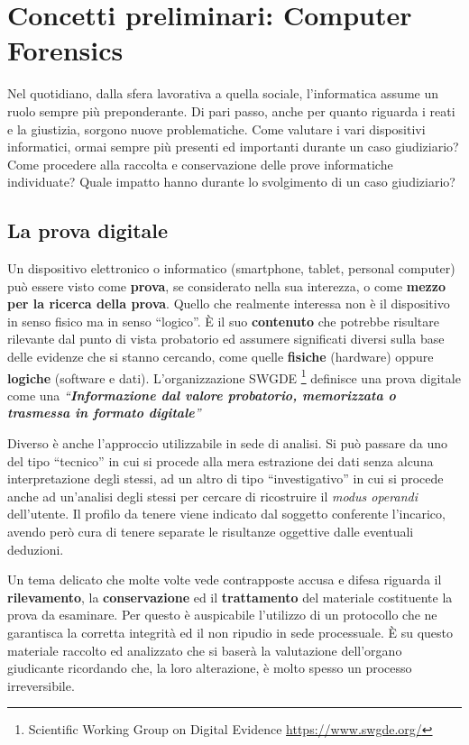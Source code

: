 \chapter{Concetti preliminari: Computer Forensics}


Nel quotidiano, dalla sfera lavorativa a quella sociale, l'informatica assume un ruolo sempre più preponderante. Di pari passo, anche per quanto riguarda i reati e la giustizia, sorgono nuove problematiche. Come valutare i vari dispositivi informatici, ormai sempre più presenti ed importanti durante un caso giudiziario? Come procedere alla raccolta e conservazione delle prove informatiche individuate? Quale impatto hanno durante lo svolgimento di un caso giudiziario? \nocite{Florindi}

\section{La prova digitale}

Un dispositivo elettronico o informatico (smartphone, tablet, personal computer) può essere visto come \textbf{prova}, se considerato nella sua interezza, o come \textbf{mezzo per la ricerca della prova}. Quello che realmente interessa non è il dispositivo in senso fisico ma in senso ``logico''. \`E il suo \textbf{contenuto} che potrebbe risultare rilevante dal punto di vista probatorio ed assumere significati diversi sulla base delle evidenze che si stanno cercando, come quelle \textbf{fisiche} (hardware) oppure \textbf{logiche} (software e dati). L'organizzazione SWGDE \footnote{Scientific Working Group on Digital Evidence \url{https://www.swgde.org/}} definisce una prova digitale come una \textit{``\textbf{Informazione dal valore probatorio, memorizzata o trasmessa in formato digitale}''} \cite{Swdge}

Diverso è anche l'approccio utilizzabile in sede di analisi. Si può passare da uno del tipo ``tecnico'' in cui si procede alla mera estrazione dei dati senza alcuna interpretazione degli stessi, ad un altro di tipo ``investigativo'' in cui si procede anche ad un'analisi degli stessi per cercare di ricostruire il \textit{modus operandi} dell'utente. Il profilo da tenere viene indicato dal soggetto conferente l'incarico, avendo però cura di tenere separate le risultanze oggettive dalle eventuali deduzioni.

Un tema delicato che molte volte vede contrapposte accusa e difesa riguarda il \textbf{rilevamento}, la \textbf{conservazione} ed il \textbf{trattamento} del materiale costituente la prova da esaminare. Per questo è auspicabile l'utilizzo di un protocollo che ne garantisca la corretta integrità ed il non ripudio in sede processuale. \`E su questo materiale raccolto ed analizzato che si baserà la valutazione dell'organo giudicante ricordando che, la loro alterazione, è molto spesso un processo irreversibile.

